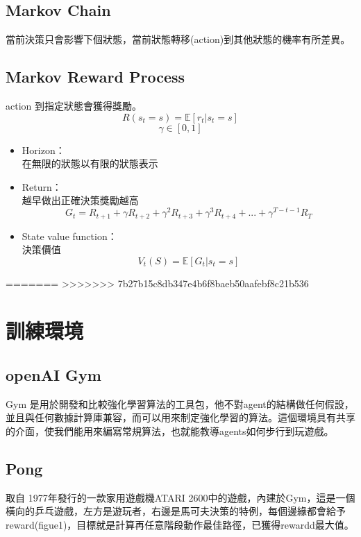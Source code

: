 \documentclass[14pt,a4paper]{report}  %
\begin{document}
\section{Markov Chain}
\quad 當前決策只會影響下個狀態，當前狀態轉移(action)到其他狀態的機率有所差異。
\section{Markov Reward Process}
\quad action 到指定狀態會獲得獎勵。
$$R(s_t=s) = \mathbb{E}[r_t|s_t = s]$$
$$\gamma \in [0, 1]$$
\begin{itemize}
\item Horizon：\\
在無限的狀態以有限的狀態表示\\
\item Return：\\
越早做出正確決策獎勵越高\\
$$G_t = R_{t+1}+\gamma R_{t+2}+\gamma^2 R_{t+3}+\gamma^3 R_{t+4}+...+\gamma^{T-t-1} R_{T}$$

\item State value function：\\
決策價值\\
$$V_t(S) = \mathbb{E}[G_t|s_t = s]$$
\begin{center}
\hspace{-4em}
\end{center}
\end{itemize}
=======
>>>>>>> 7b27b15c8db347e4b6f8baeb50aafebf8c21b536

\newpage
\chapter{訓練環境}
\section{openAI Gym}
 Gym 是用於開發和比較強化學習算法的工具包，他不對agent的結構做任何假設，並且與任何數據計算庫兼容，而可以用來制定強化學習的算法。這個環境具有共享的介面，使我們能用來編寫常規算法，也就能教導agents如何步行到玩遊戲。\\[6pt]


\section{Pong}
 取自 1977年發行的一款家用遊戲機ATARI 2600中的遊戲，內建於Gym，這是一個橫向的乒乓遊戲，左方是遊玩者，右邊是馬可夫決策的特例，每個邊緣都會給予reward(figue1)，目標就是計算再任意階段動作最佳路徑，已獲得rewardd最大值。
\end{document}
